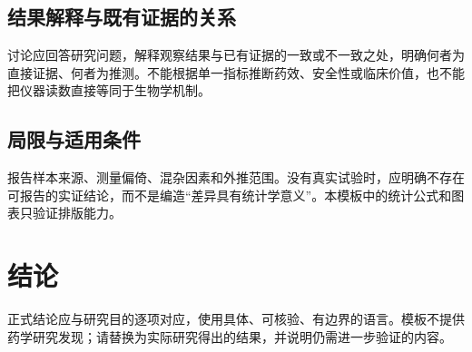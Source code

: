 \subsection{结果解释与既有证据的关系}
讨论应回答研究问题，解释观察结果与已有证据的一致或不一致之处，明确何者为直接证据、何者为推测。不能根据单一指标推断药效、安全性或临床价值，也不能把仪器读数直接等同于生物学机制。
\subsection{局限与适用条件}
报告样本来源、测量偏倚、混杂因素和外推范围。没有真实试验时，应明确不存在可报告的实证结论，而不是编造“差异具有统计学意义”。本模板中的统计公式和图表只验证排版能力。
\section{结论}
正式结论应与研究目的逐项对应，使用具体、可核验、有边界的语言。模板不提供药学研究发现；请替换为实际研究得出的结果，并说明仍需进一步验证的内容。
